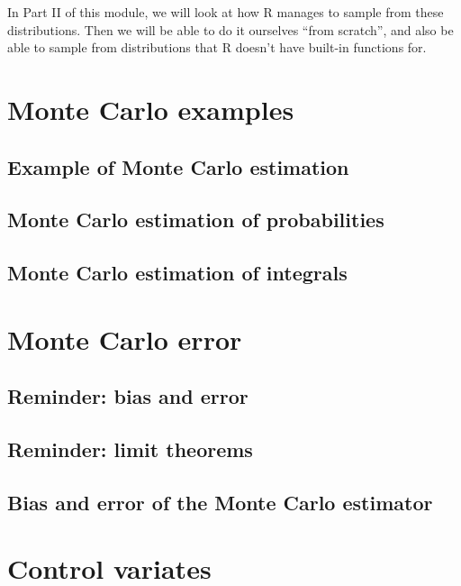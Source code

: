 \documentclass[
  letterpaper,
  DIV=11,
  numbers=noendperiod]{scrreprt}
\theoremstyle{definition}
\theoremstyle{definition}
\theoremstyle{remark}
\begin{document}
In Part II of this module, we will look at how R manages to sample from
these distributions. Then we will be able to do it ourselves ``from
scratch'', and also be able to sample from distributions that R doesn't
have built-in functions for.

\chapter{Monte Carlo examples}\label{monte-carlo-examples}

\section{Example of Monte Carlo
estimation}\label{example-of-monte-carlo-estimation}

\section{Monte Carlo estimation of
probabilities}\label{monte-carlo-estimation-of-probabilities}

\section{Monte Carlo estimation of
integrals}\label{monte-carlo-estimation-of-integrals}

\chapter{Monte Carlo error}\label{monte-carlo-error}

\section{Reminder: bias and error}\label{reminder-bias-and-error}

\section{Reminder: limit theorems}\label{reminder-limit-theorems}

\section{Bias and error of the Monte Carlo
estimator}\label{bias-and-error-of-the-monte-carlo-estimator}

\chapter{Control variates}\label{control-variates}
\end{document}
